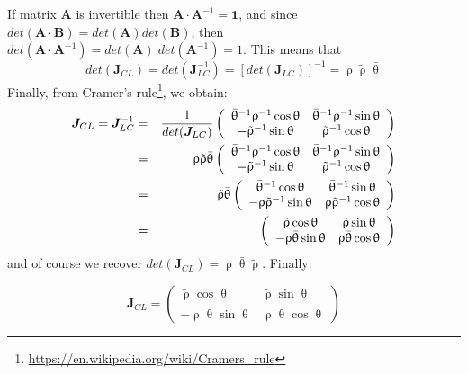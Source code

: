 If matrix ${\bm A}$ is invertible then ${\bm A}\cdot {\bm A}^{-1}={\bm 1}$,
and since $det({\bm A}\cdot {\bm B}) = det({\bm A}) det ({\bm B})$, then
$det({\bm A}\cdot {\bm A}^{-1})= det({\bm A})\; det ({\bm A}^{-1}) =1$.
This means that
\[
det({\bm J}_{CL})
=det({\bm J}_{LC}^{-1})
=[det({\bm J}_{LC})]^{-1}
=  \uprho \tilde{\uprho}  \bar{\uptheta}
\]
Finally, 
from Cramer's rule\footnote{\url{https://en.wikipedia.org/wiki/Cramers_rule}},
we obtain:
\begin{eqnarray}
{\bm J}_{CL} = 
{\bm J}_{LC}^{-1} &=& 
\frac{1}{det({\bm J}_{LC})} 
\left(
\begin{array}{cc}
\bar{\uptheta}^{-1}\uprho^{-1}\cos\uptheta & 
\bar{\uptheta}^{-1}\uprho^{-1}\sin\uptheta \\
-\tilde{\uprho}^{-1}\sin\uptheta 
&\tilde{\uprho}^{-1}\cos\uptheta 
\end{array}
\right) \nonumber\\
&=&
\uprho \tilde{\uprho}  \bar{\uptheta}
\left(
\begin{array}{cc}
\bar{\uptheta}^{-1}\uprho^{-1}\cos\uptheta & 
\bar{\uptheta}^{-1}\uprho^{-1}\sin\uptheta \\
-\tilde{\uprho}^{-1}\sin\uptheta 
&\tilde{\uprho}^{-1}\cos\uptheta 
\end{array}
\right) \nonumber\\
&=&
\tilde{\uprho}  \bar{\uptheta}
\left(
\begin{array}{cc}
\bar{\uptheta}^{-1}\cos\uptheta & 
\bar{\uptheta}^{-1}\sin\uptheta \\
-\uprho\tilde{\uprho}^{-1}\sin\uptheta 
&\uprho\tilde{\uprho}^{-1}\cos\uptheta 
\end{array}
\right) \nonumber\\
&=&
\left(
\begin{array}{cc}
\tilde{\uprho}\cos\uptheta & 
\tilde{\uprho}\sin\uptheta \\
-\uprho\bar{\uptheta}\sin\uptheta 
&\uprho\bar{\uptheta}\cos\uptheta 
\end{array}
\right) 
\end{eqnarray}
and of course we recover $det({\bm J}_{CL})=\uprho \bar{\uptheta}  \tilde{\uprho}$.
Finally:
\begin{mdframed}[backgroundcolor=blue!5]
\[
{\bm J}_{CL} = 
\left(
\begin{array}{cc}
\tilde{\uprho}\cos\uptheta & 
\tilde{\uprho}\sin\uptheta \\
-\uprho\bar{\uptheta}\sin\uptheta 
&\uprho\bar{\uptheta}\cos\uptheta 
\end{array}
\right) 
\]
\end{mdframed}





